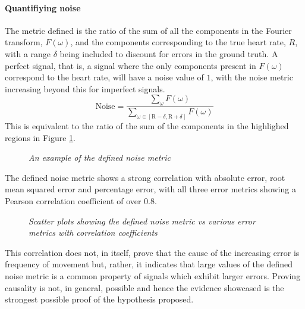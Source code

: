 \paragraph{Quantifiying noise}
The metric defined is the ratio of the sum of all the components in the Fourier transform, $F(\omega)$, and the components corresponding to the true heart rate, $R$, with a range $\delta$ being included to discount
for errors in the ground truth. A perfect signal, that is, a signal where the only components present in $F(\omega)$ correspond to the heart rate, will have a noise value of $1$, with the noise metric increasing beyond this for imperfect signals.
\begin{equation*}
    \text{Noise} = \frac{\sum_{\omega} F(\omega)}{ \sum_{\omega \in [\text{R}-\delta, \text{R}+\delta ]}F(\omega)}  
\end{equation*}
This is equivalent to the ratio of the sum of the components in the highlighed regions in Figure \ref{fig:noise_metric}.
\begin{figure}[H]
    \centering
    \subfloat{\scalebox{0.8}{}}%
    \subfloat{\scalebox{0.8}{ }}%
    \subfloat{\scalebox{0.8}{ }}%
   \caption{\textit{An example of the defined noise metric} }
   \label{fig:noise_metric}
\end{figure}
\noindent
The defined noise metric shows a strong correlation with absolute error, root mean squared error and percentage error, with all three error metrics showing a Pearson correlation coefficient of over 0.8.
\begin{figure}[H]
    \centering
    \subfloat{\scalebox{0.6}{}}
    \subfloat{\scalebox{0.6}{}}
    \subfloat{\scalebox{0.6}{}}
    \caption{\textit{Scatter plots showing the defined noise metric vs various error metrics with correlation coefficients}}
\end{figure}
\noindent
This correlation does not, in itself, prove that the cause of the increasing error is frequency of movement but, rather,
it indicates that large values of the defined noise metric is a common property of signals which exhibit larger errors.
Proving causality is not, in general, possible and hence the evidence showcased is the strongest possible proof of the hypothesis proposed.


